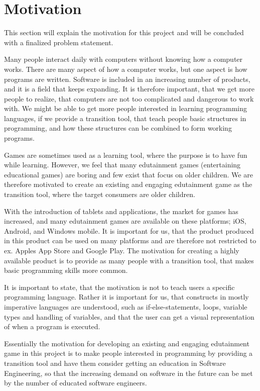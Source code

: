 \section{Motivation}
\label{sec:motivation}

This section will explain the motivation for this project and will be concluded with a finalized problem statement.


Many people interact daily with computers without knowing how a computer works. There are many aspect of how a computer works, but one aspect is how programs are written.
Software is included in an increasing number of products, and it is a field that keeps expanding.
It is therefore important, that we get more people to realize, that computers are not too complicated and dangerous to work with.
We might be able to get more people interested in learning programming languages, if we provide a transition tool, that teach people basic structures in programming, and how these structures can be combined to form working programs.


Games are sometimes used as a learning tool, where the purpose is to have fun while learning.
However, we feel that many edutainment games (entertaining educational games) are boring and few exist that focus on older children.
We are therefore motivated to create an existing and engaging edutainment game as the transition tool, where the target consumers are older children. 


With the introduction of tablets and applications, the market for games has increased, and many edutainment games are available on these platforms; iOS, Android, and Windows mobile.
It is important for us, that the product produced in this product can be used on many platforms and are therefore not restricted to ex. Apples App Store and Google Play.
The motivation for creating a highly available product is to provide as many people with a transition tool, that makes basic programming skills more common.


It is important to state, that the motivation is not to teach users a specific programming language.
Rather it is important for us, that constructs in mostly imperative languages are understood, such as if-else-statements, loops, variable types and handling of variables, and that the user can get a visual representation of when a program is executed.


Essentially the motivation for developing an existing and engaging edutainment game in this project is to make people interested in programming by providing a transition tool and have them consider getting an education in Software Engineering, so that the increasing demand on software in the future can be met by the number of educated software engineers.